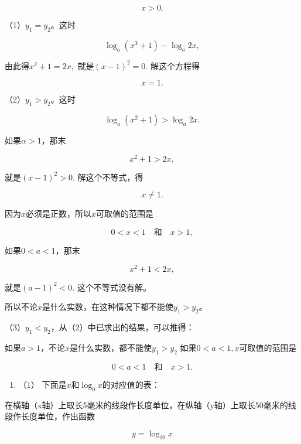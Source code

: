 \[
x > 0.
\]

（1）\(y_{1} = y_{2}\)。这时

\[
\log_{a} (x^{3} + 1) - \log_{a} 2 x,
\]

由此得\(x^{2} + 1 = 2x,\) 就是\((x - 1)^{2} = 0.\) 解这个方程得

\[
x = 1.
\]

（2）\(y_{1} > y_{2}\)。这时

\[
\log_{a} (x^{2} + 1) > \log_{a} 2 x.
\]

如果\(\alpha > 1\)，那末

\[
x^{2} + 1 > 2 x,
\]

就是\((x - 1)^{2} > 0.\) 解这个不等式，得

\[
x \neq 1.
\]

因为\(x\)必须是正数，所以\(x\)可取值的范围是

\[
0 < x < 1 \quad \text{和} \quad x > 1,
\]

如果\(0 < a < 1\)，那末

\[
x^{2} + 1 < 2 x,
\]

就是\((a - 1)^{2} < 0.\) 这个不等式没有解。

所以不论\(x\)是什么实数，在这种情况下都不能使\(y_{1} > y_{2}\)。

（3）\(y_{1}<y_{2}\)，从（2）中已求出的结果，可以推得：

如果\(a > 1\)，不论\(x\)是什么实数，都不能使\(y_{1} > y_{2}\)
如果\(0 < a < 1, x\)可取值的范围是

\[
0 < a < 1 \quad \text{和} \quad x > 1.
\]

\begin{enumerate}
\item
  （1） 下面是\(x\)和\(\log_0 x\)的对应值的表：
\end{enumerate}

{\centering
\scriptsize\setlength{\tabcolsep}{2.2pt}%
\par
}

在横轴（x轴）上取长5毫米的线段作长度单位，在纵轴（y轴）上取长50毫米的线段作长度单位，作出函数

\[
y = \log_{10} x
\]

